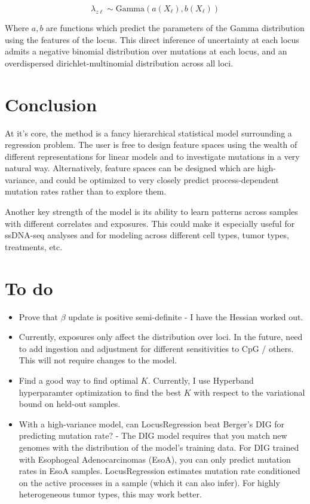 \documentclass{article}
\begin{document}
\begin{equation}
\lambda_{z\ell} \sim \mathrm{Gamma}(a(X_\ell), b(X_\ell))
\end{equation}

Where $a, b$ are functions which predict the parameters of the Gamma distribution using the features of the locus. This direct inference of uncertainty at each locus admits a negative binomial distribution over mutations at each locus, and an overdispersed dirichlet-multinomial distribution across all loci.

\section{Conclusion}

At it's core, the method is a fancy hierarchical statistical model surrounding a regression problem. The user is free to design feature spaces using the wealth of different representations for linear models and to investigate mutations in a very natural way. Alternatively, feature spaces can be designed which are high-variance, and could be optimized to very closely predict process-dependent mutation rates rather than to explore them.

Another key strength of the model is its ability to learn patterns across samples with different correlates and exposures. This could make it especially useful for ssDNA-seq analyses and for modeling across different cell types, tumor types, treatments, etc.

\section{To do}

\begin{itemize}
  \item Prove that $\beta$ update is positive semi-definite - I have the Hessian worked out.
  \item Currently, exposures only affect the distribution over loci. In the future, need to add ingestion and adjustment for 
  	different sensitivities to CpG / others. This will not require changes to the model.
  \item Find a good way to find optimal $K$. Currently, I use Hyperband hyperparamter optimization to find the best $K$ with respect to the variational bound on held-out samples.
  \item With a high-variance model, can LocusRegression beat Berger's DIG for predicting mutation rate? - The DIG model requires that you match new genomes with the distribution of the model's training data. For DIG trained with Esophogeal Adenocarcinomas (EsoA), you can only predict mutation rates in EsoA samples. LocusRegression estimates mutation rate conditioned on the active processes in a sample (which it can also infer). For highly heterogeneous tumor types, this may work better.
\end{itemize}
\end{document}
